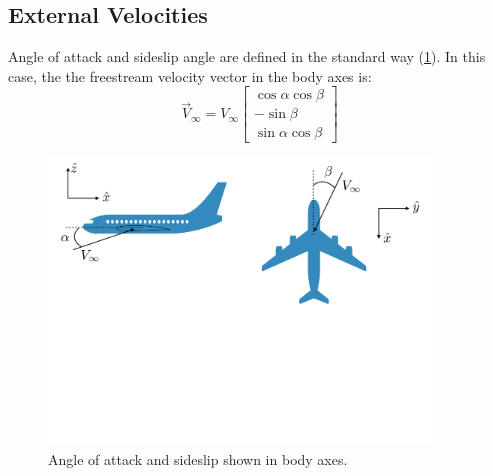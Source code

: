 \documentclass{article}
\begin{document}
\subsection{External Velocities}

Angle of attack and sideslip angle are defined in the standard way (\cref{fig:alphabeta2}).  In this case, the the freestream velocity vector in the body axes is: 
\begin{equation}
    \vec{V}_{\infty} = V_\infty
    \begin{bmatrix}
    \cos\alpha\cos\beta\\
    -\sin\beta\\
    \sin\alpha\cos\beta
    \end{bmatrix}
    \label{eq:Vinf}
\end{equation}

\begin{figure}[htbp]
\centering
\includegraphics[width=4.0in]{figs/alphabeta2}
\caption{Angle of attack and sideslip shown in body axes.}
\label{fig:alphabeta2}
\end{figure}
\end{document}
